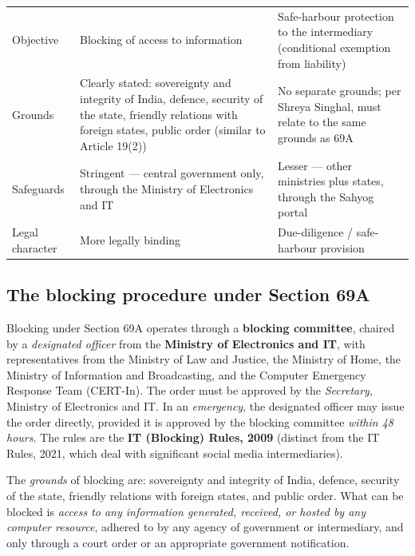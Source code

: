 \begin{tabularx}{\textwidth}{YYY}
\toprule
{} &  &  \\
\midrule
Objective & Blocking of access to information & Safe-harbour protection to the
intermediary (conditional exemption from liability) \\
\addlinespace[3pt]
Grounds & Clearly stated: sovereignty and integrity of India, defence, security of the
state, friendly relations with foreign states, public order (similar to Article 19(2)) &
No separate grounds; per Shreya Singhal, must relate to the same grounds as 69A \\
\addlinespace[3pt]
Safeguards & Stringent — central government only, through the Ministry of Electronics and
IT & Lesser — other ministries plus states, through the Sahyog portal \\
\addlinespace[3pt]
Legal character & More legally binding & Due-diligence / safe-harbour provision \\
\bottomrule
\end{tabularx}

\subsection{The blocking procedure under Section 69A}

\begin{GovtPolicy}
Blocking under Section 69A operates through a \textbf{blocking committee}, chaired by a
\emph{designated officer} from the \textbf{Ministry of Electronics and IT}, with
representatives from the Ministry of Law and Justice, the Ministry of Home, the Ministry
of Information and Broadcasting, and the Computer Emergency Response Team (CERT-In). The
order must be approved by the \emph{Secretary}, Ministry of Electronics and IT. In an
\emph{emergency}, the designated officer may issue the order directly, provided it is
approved by the blocking committee \emph{within 48 hours}. The rules are the
\textbf{IT (Blocking) Rules, 2009} (distinct from the IT Rules, 2021, which deal with
significant social media intermediaries).
\end{GovtPolicy}

The \emph{grounds} of blocking are: sovereignty and integrity of India, defence, security
of the state, friendly relations with foreign states, and public order. What can be
blocked is \emph{access to any information generated, received, or hosted by any computer
resource}, adhered to by any agency of government or intermediary, and only through a
court order or an appropriate government notification.

